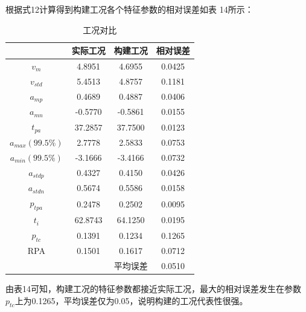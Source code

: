 \documentclass[bwprint]{gmcmthesis}
\begin{document}
根据式12计算得到构建工况各个特征参数的相对误差如表 14所示：
\begin{table}[htbp]
\caption{工况对比}
\centering
\begin{tabular}{c c c c}%
\hline  %
&	实际工况&构建工况&相对误差\\
\hline
$v_m$	&4.8951	&4.6955	&0.0425\\
$v_{std}$	&5.4513&	4.8757	&0.1181\\
$a_{mp}$	&0.4689	&0.4887	&0.0406\\
$a_{mn}$	&-0.5770	&-0.5861	&0.0155\\
$t_{pa}$&37.2857	&37.7500	&0.0123\\
$a_{max}(99.5\%)$&	2.7778	&2.5833	&0.0753\\
$a_{min}(99.5\%)$	&-3.1666	&-3.4166	&0.0732\\
$a_{stdp}$	&0.4327&	0.4150	&0.0426\\
$a_{stdn}$	&0.5674	&0.5586&	0.0158\\
$p_{tpa}	$&0.2478	&0.2502	&0.0095\\
$t_i$	&62.8743	&64.1250	&0.0195\\
$p_{tc}$	&0.1391&	0.1234&	0.1265\\
RPA	&0.1501	&0.1617&	0.0712\\
		&&平均误差&	0.0510\\

\hline  %
\end{tabular}
\end{table}

由表14可知，构建工况的特征参数都接近实际工况，最大的相对误差发生在参数$p_{tc}$上为0.1265，平均误差仅为0.05，说明构建的工况代表性很强。
\end{document}
